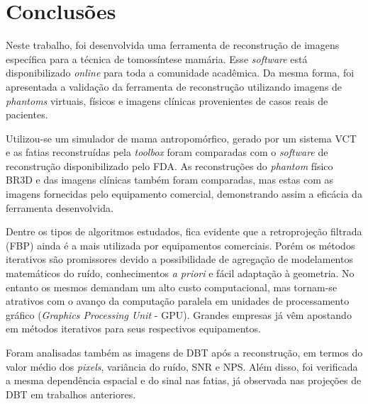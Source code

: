 \chapter[Conclusões]{Conclusões}\label{Capitulo7}

Neste trabalho, foi desenvolvida uma ferramenta de reconstrução de imagens específica para a técnica de tomossíntese mamária. Esse \textit{software} está disponibilizado \textit{online} para toda a comunidade acadêmica. Da mesma forma, foi apresentada a validação da ferramenta de reconstrução utilizando imagens de \textit{phantoms} virtuais, físicos e imagens clínicas provenientes de casos reais de pacientes.  

Utilizou-se um simulador de mama antropomórfico, gerado por um sistema \acs{VCT} e as fatias reconstruídas pela \textit{toolbox} foram comparadas com o \textit{software} de reconstrução disponibilizado pelo \acs{FDA}. As reconstruções do \textit{phantom} físico BR3D e das imagens clínicas também foram comparadas, mas estas com as imagens fornecidas pelo equipamento comercial, demonstrando assim a eficácia da ferramenta desenvolvida. 


Dentre os tipos de algoritmos estudados, fica evidente que a retroprojeção filtrada (\acs{FBP}) ainda é a mais utilizada por equipamentos comerciais. Porém os métodos iterativos são promissores devido a possibilidade de agregação de modelamentos matemáticos do ruído, conhecimentos \textit{a priori} e fácil adaptação à geometria. No entanto os mesmos demandam um alto custo computacional, mas tornam-se atrativos com o avanço da computação paralela em unidades de processamento gráfico (\textit{Graphics Processing Unit} - \acs{GPU}). Grandes empresas já vêm apostando em métodos iterativos para seus respectivos equipamentos.

Foram analisadas também as imagens de \acs{DBT} após a reconstrução, em termos do valor médio dos \textit{pixels}, variância do ruído, \acs{SNR} e \acs{NPS}. Além disso, foi verificada a mesma dependência espacial e do sinal nas fatias,  já observada nas projeções de \acs{DBT} em trabalhos anteriores.

